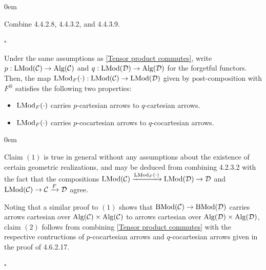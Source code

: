 \documentclass[10pt]{article}
\newcommand{\C}{\mathcal C}
\newcommand{\cD}{\mathcal{D}}
\renewcommand{\qed}{\hfill$\square$}
\renewenvironment{proof}{\begin{addmargin}[1em]{0em}\begin{newproof}}{\end{newproof}\end{addmargin}\qed}
\theoremstyle{witharg}
\theoremstyle{witharg}
\theoremstyle{witharg2}
\begin{document}
\begin{proof}

    Combine  4.4.2.8,  4.4.3.2, and  4.4.3.9. 
    
\end{proof}



\begin{corollary}{}\label{Pres. of cocart arrows for LMod cor}

    Under the same assumptions as \ref{Tensor product commutes}, write $p:\textnormal{LMod}(\C)\rightarrow \textnormal{Alg}(\C)$ and $q:\textnormal{LMod}(\cD)\rightarrow \textnormal{Alg}(\cD)$ for the forgetful functors. Then, the map $\textnormal{LMod}_F(\cdot):\textnormal{LMod}(\C)\rightarrow \textnormal{LMod}(\cD)$ given by post-composition with $F^\otimes$ satisfies the following two properties:

    \begin{itemize}
    
        \item [$(1)$] $\textnormal{LMod}_F(\cdot)$ carries $p$-cartesian arrows to $q$-cartesian arrows. 

        \item [$(2)$] $\textnormal{LMod}_F(\cdot)$ carries $p$-cocartesian arrows to $q$-cocartesian arrows. 
        
    \end{itemize}
    
\end{corollary}

\begin{proof}

 Claim $(1)$ is true in general without any assumptions about the existence of certain geometric realizations, and may be deduced from combining  4.2.3.2 with the fact that the compositions $\textnormal{LMod}(\C)\xrightarrow{\textnormal{LMod}_F(\cdot)}\textnormal{LMod}(\cD)\rightarrow \cD$ and $\textnormal{LMod}(\C)\rightarrow \C \xrightarrow{F}\cD$ agree. 

 Noting that a similar proof to $(1)$ shows that $\textnormal{BMod}(\C)\rightarrow \textnormal{BMod}(\cD)$ carries arrows cartesian over $\textnormal{Alg}(\C)\times \textnormal{Alg}(\C)$ to arrows cartesian over $\textnormal{Alg}(\cD)\times \textnormal{Alg}(\cD)$, claim $(2)$ follows from combining \ref{Tensor product commutes} with the respective contructions of $p$-cocartesian arrows and $q$-cocartesian arrows given in the proof of  4.6.2.17.
 
 
\end{proof}
\end{document}
